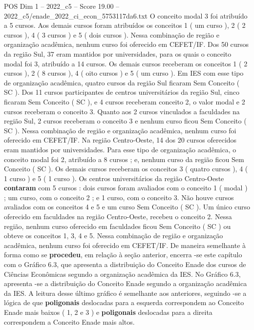 \begin{textsample}{POS Dim 1 – 2022\_c5 – Score 19.00 – 2022\_c5/enade\_2022\_ci\_econ\_5753117da6.txt}
O conceito modal 3 foi atribuído a 5 cursos.
Aos demais cursos foram atribuídos os conceitos 1 ( um curso ), 2 ( 2 cursos ), 4 ( 3 cursos ) e 5 ( dois cursos ).
Nessa combinação de região e organização acadêmica, nenhum curso foi oferecido em CEFET/IF.
Dos 50 cursos da região Sul, 37 eram mantidos por universidades, para os quais o conceito modal foi 3, atribuído a 14 cursos.
Os demais cursos receberam os conceitos 1 ( 2 cursos ), 2 ( 8 cursos ), 4 ( oito cursos ) e 5 ( um curso ).
Em IES com esse tipo de organização acadêmica, quatro cursos da região Sul ficaram Sem Conceito ( SC ).
Dos 11 cursos participantes de centros universitários da região Sul, cinco ficaram Sem Conceito ( SC ), e 4 cursos receberam conceito 2, o valor modal e 2 cursos receberam o conceito 3.
Quanto aos 2 cursos vinculados a faculdades na região Sul, 2 cursos receberam o conceito 3 e nenhum curso ficou Sem Conceito ( SC ).
Nessa combinação de região e organização acadêmica, nenhum curso foi oferecido em CEFET/IF.
Na região Centro-Oeste, 14 dos 20 cursos oferecidos eram mantidos por universidades.
Para esse tipo de organização acadêmica, o conceito modal foi 2, atribuído a 8 cursos ; e, nenhum curso da região ficou Sem Conceito ( SC ).
Os demais cursos receberam os conceitos 3 ( quatro cursos ), 4 ( 1 curso ) e 5 ( 1 curso ).
Os centros universitários da região Centro-Oeste \textbf{contaram} com 5 cursos : dois cursos foram avaliados com o conceito 1 ( modal ) ; um curso, com o conceito 2 ; e 1 curso, com o conceito 3.
Não houve cursos avaliados com os conceitos 4 e 5 e um curso Sem Conceito ( SC ).
Um único curso oferecido em faculdades na região Centro-Oeste, recebeu o conceito 2.
Nessa região, nenhum curso oferecido em faculdades ficou Sem Conceito ( SC ) ou obteve os conceitos 1, 3, 4 e 5.
Nessa combinação de região e organização acadêmica, nenhum curso foi oferecido em CEFET/IF.
De maneira semelhante à forma como se \textbf{procedeu}, em relação à seção anterior, encerra -se este capítulo com o Gráfico 6.3, que apresenta a distribuição do Conceito Enade dos cursos de Ciências Econômicas segundo a organização acadêmica da IES.
No Gráfico 6.3, apresenta -se a distribuição do Conceito Enade segundo a organização acadêmica da IES.
A leitura desse último gráfico é semelhante aos anteriores, seguindo -se a lógica de que \textbf{poligonais} deslocadas para a esquerda correspondem ao Conceito Enade mais baixos ( 1, 2 e 3 ) e \textbf{poligonais} deslocadas para a direita correspondem a Conceito Enade mais altos.

\end{textsample}

